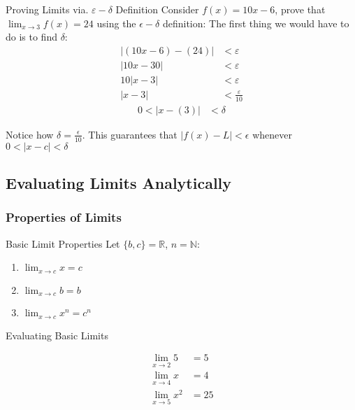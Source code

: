 \documentclass{MathNotes}
\begin{document}
\begin{example}{Proving Limits via. $\varepsilon-\delta$ Definition}
    Consider $f(x)=10x-6$, prove that $\lim_{x\to 3}f(x)=24$ using the 
    $\epsilon-\delta$ definition:
    \br
    The first thing we would have to do is to find $\delta$:
    \begin{align*}
        \lvert (10x-6)-(24) \rvert &<\varepsilon  \\
        \lvert 10x-30 \rvert &<\varepsilon \\
        10\lvert x-3 \rvert &<\varepsilon \\
        \lvert x-3 \rvert &<\frac{\varepsilon}{10}
    \end{align*}
    \begin{align*}
        0 < \lvert x - (3)\rvert &< \delta
    \end{align*}

    Notice how $\delta=\frac{\epsilon}{10}$. This guarantees that
    $\lvert f(x)-L \rvert < \epsilon$ whenever $0<\lvert x-c \rvert<\delta$
\end{example}

\newpage
\subsection{Evaluating Limits Analytically}

\subsubsection{Properties of Limits}

\begin{multicols}{2}[]
    \begin{theorem}{Basic Limit Properties}
        Let $\{b, c\}=\mathbb{R}$, $n=\mathbb{N}$:

        \begin{enumerate}
            \item $\lim_{x\to c}x=c$ 
            \item $\lim_{x\to c}b=b$ 
            \item $\lim_{x\to c}x^n=c^n$
        \end{enumerate}
    \end{theorem}

    \begin{example}{Evaluating Basic Limits}
        \begin{center}
            \begin{align*}
                \lim_{x\to 2}5&=5 \\  
                \lim_{x\to 4}x&=4 \\
                \lim_{x\to 5}x^2&=25
            \end{align*}
        \end{center}
    \end{example}
\end{multicols}
\end{document}
